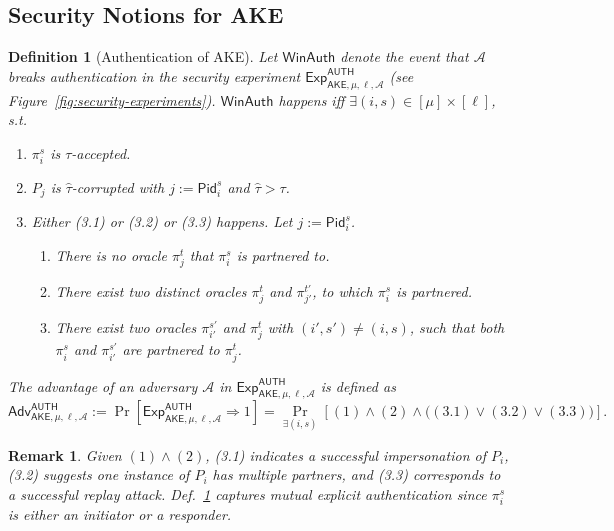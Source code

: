 \documentclass[a4paper,11pt]{article}
\newtheorem{defn}{Definition}[]
\newtheorem{rmk}{Remark}[]
\begin{document}
\begin{sloppypar}
\subsection{Security Notions for AKE}

\begin{defn}[Authentication of AKE] \label{def:auth}
Let $\mathsf{WinAuth}$ denote the event that $\mathcal{A}$ breaks authentication in the security experiment $\mathsf{Exp}^{\mathsf{AUTH}}_{\mathsf{AKE},\mu,\ell,\mathcal{A}}$ (see Figure~\ref{fig:security-experiments}). $\mathsf{WinAuth}$ happens iff $\exists (i, s) \in [\mu] \times [\ell]$, s.t.
\begin{enumerate}
    \item[(1)] $\pi^s_i$ is $\tau$-accepted.
    \item[(2)] $P_j$ is $\hat{\tau}$-corrupted with $j := \mathsf{Pid}^s_i$ and $\hat{\tau} > \tau$.
    \item[(3)] Either (3.1) or (3.2) or (3.3) happens. Let $j := \mathsf{Pid}^s_i$.
    \begin{enumerate}
        \item[(3.1)] There is no oracle $\pi^t_j$ that $\pi^s_i$ is partnered to.
        \item[(3.2)] There exist two distinct oracles $\pi^t_j$ and $\pi^{t'}_{j'}$, to which $\pi^s_i$ is partnered.
        \item[(3.3)] There exist two oracles $\pi^{s'}_{i'}$ and $\pi^t_j$ with $(i', s') \neq (i, s)$, such that both $\pi^s_i$ and $\pi^{s'}_{i'}$ are partnered to $\pi^t_j$.
    \end{enumerate}
\end{enumerate}
The advantage of an adversary $\mathcal{A}$ in $\mathsf{Exp}^{\mathsf{AUTH}}_{\mathsf{AKE},\mu,\ell,\mathcal{A}}$ is defined as
\[
\mathsf{Adv}^{\mathsf{AUTH}}_{\mathsf{AKE},\mu,\ell,\mathcal{A}} := \Pr\left[\mathsf{Exp}^{\mathsf{AUTH}}_{\mathsf{AKE},\mu,\ell,\mathcal{A}} \Rightarrow 1\right] = \Pr_{\exists (i,s)}\left[(1) \land (2) \land \bigl((3.1) \lor (3.2) \lor (3.3)\bigr)\right].
\]
\end{defn}

\begin{rmk}
Given $(1) \land (2)$, (3.1) indicates a successful impersonation of $P_i$, (3.2) suggests one instance of $P_i$ has multiple partners, and (3.3) corresponds to a successful replay attack. Def.~\ref{def:auth} captures mutual explicit authentication since $\pi^s_i$ is either an initiator or a responder.
\end{rmk}


\end{sloppypar}
\end{document}
